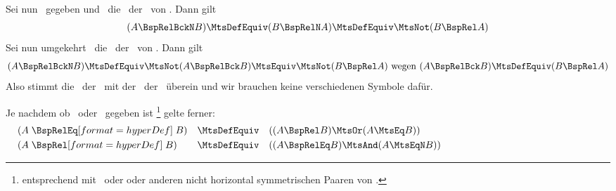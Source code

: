 Sei nun \BspRel\ gegeben und  \BspRelBckN\ die \Umkehrrelation\ der \Negation\ von \BspRel.
Dann gilt \[(A \BspRelBckN B) \MtsDefEquiv (B \BspRelN A) \MtsDefEquiv \MtsNot (B \BspRel A)\]
Sei nun umgekehrt \BspRelBckN\ die \Negation\ der \Umkehrrelation\ von \BspRel.
Dann gilt \[(A \BspRelBckN B) \MtsDefEquiv \MtsNot (A \BspRelBck B) \MtsEquiv \MtsNot (B \BspRel A) \text{ wegen } (A \BspRelBck B) \MtsDefEquiv (B \BspRel A)\]
Also stimmt die \Umkehrrelation\ der \Negation\ mit der \Negation\ der \Umkehrrelation\ überein und wir brauchen keine verschiedenen Symbole dafür.

Je nachdem ob \BspRel\ oder \BspRelEq\ gegeben ist%
\footnote{%
	entsprechend mit \BspRelBck\ oder \BspRelBckEq oder anderen nicht horizontal symmetrischen Paaren von \Symbolen.
}
gelte ferner:
\begin{align}
	& (A \defSymBin{\BspRelEq}   B) & \MtsDefEquiv \quad & ((A \BspRel   B) \MtsOr  (A \MtsEq B))
	\label{def:releq} \\
	& (A \defSymBin{\BspRel}     B) & \MtsDefEquiv \quad & ((A \BspRelEq B) \MtsAnd (A \MtsEqN B))
	\label{def:relbsp}   \formulatoleft\formulatoleft\formulatoleft
\end{align}

